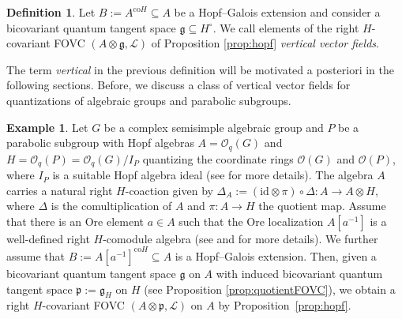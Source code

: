 \documentclass{article}
\theoremstyle{definition}
\newtheorem{definition}[thm]{Definition}
\newtheorem{example}[thm]{Example}
\newcommand{\cO}{{\mathcal{O}}}
\begin{document}
\begin{definition}
	Let $B:=A^{\mathrm{co}H}\subseteq A$ be a Hopf--Galois extension and consider a bicovariant quantum tangent space $\mathfrak{g}\subseteq H^\circ$. We call elements of the right $H$-covariant FOVC $(A\otimes\mathfrak{g},\mathscr{L})$ of Proposition \ref{prop:hopf} \emph{vertical vector fields}.
\end{definition}

The term \emph{vertical} in the previous definition will be motivated a posteriori in the following sections. Before, we discuss a class of vertical vector fields for quantizations of algebraic groups and parabolic subgroups.

\begin{example}\label{ex-loc-p}
	Let $G$ be a complex semisimple algebraic group and $P$ be a parabolic subgroup with Hopf algebras $A=\cO_q(G)$ and $H=\cO_q(P)=\cO_q(G)/I_P$ quantizing the coordinate rings $\mathcal{O}(G)$ and $\mathcal{O}(P)$, where $I_P$ is a suitable Hopf algebra ideal (see \cite[Section 3]{afl} for more details). The algebra $A$ carries a natural right $H$-coaction given by $\Delta_A:=(\mathrm{id} \otimes \pi)\circ\Delta\colon A\to A\otimes H$, where $\Delta$ is the comultiplication of $A$ and $\pi\colon A\to H$ the quotient map. Assume that there is an Ore element $a\in A$ such that the Ore localization $A[a^{-1}]$ is a well-defined right $H$-comodule algebra (see \cite[Section I.1.7]{Kassel} and \cite[Lemma 4.12 (i.)]{aflw} for more details). We further assume that $B:=A[a^{-1}]^{\mathrm{co}H}\subseteq A$ is a Hopf--Galois extension. Then, given a bicovariant quantum tangent space $\mathfrak{g}$ on $A$ with induced bicovariant quantum tangent space $\mathfrak{p}:=\mathfrak{g}_H$ on $H$ (see Proposition \ref{prop:quotientFOVC}), we obtain a right $H$-covariant FOVC $(A \otimes \mathfrak{p}, \mathscr{L})$ on $A$ by Proposition~\ref{prop:hopf}.  
	

\end{example}
\end{document}
